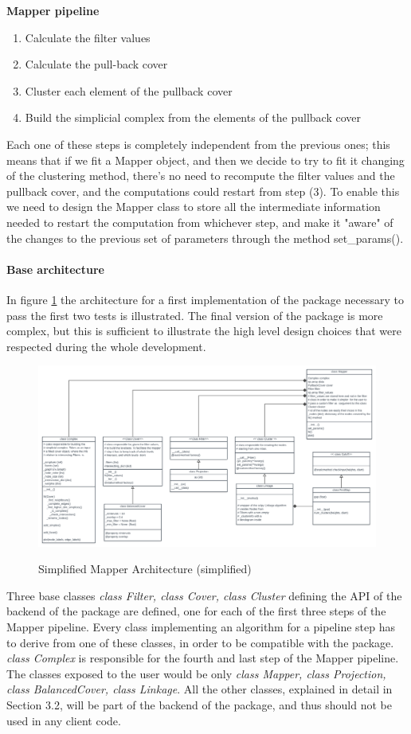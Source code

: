 \textbf{Mapper pipeline}
\begin{enumerate}
	\item Calculate the filter values
	\item Calculate the pull-back cover
	\item Cluster each element of the pullback cover
	\item Build the simplicial complex from the elements of the pullback cover
\end{enumerate}
Each one of these steps is completely independent from the previous ones; this means that if we fit a Mapper object, and then we decide to try to fit it changing of the clustering method, there's no need to recompute the filter values and the pullback cover, and the computations could restart from step (3). To enable this we need to design the Mapper class to store all the intermediate information needed to restart the computation from whichever step, and make it "aware" of the changes to the previous set of parameters through the method set\_params().\\
\paragraph{Base architecture}
In figure \ref{fig:basearchitecture} the architecture for a first implementation of the package necessary to pass the first two tests is illustrated. The final version of the package is more complex, but this is sufficient to illustrate the high level design choices that were respected during the whole development.\\
\begin{figure}[h]
	\caption{Simplified Mapper Architecture (simplified)}
	\centering
	\includegraphics[width=1\textwidth]{Figs/SimplifiedArchitecture.png}
	\label{fig:basearchitecture}
\end{figure}
Three base classes \textit{class Filter, class Cover, class Cluster} defining the API of the backend of the package are defined, one for each of the first three steps of the Mapper pipeline. Every class implementing an algorithm for a pipeline step has to derive from one of these classes,  in order to be compatible with the package. \textit{class Complex} is responsible for the fourth and last step of the Mapper pipeline. The classes exposed to the user would be only \textit{class Mapper, class Projection, class BalancedCover, class Linkage}. All the other classes, explained in detail in Section 3.2, will be part of the backend of the package, and thus should not be used in any client code.

